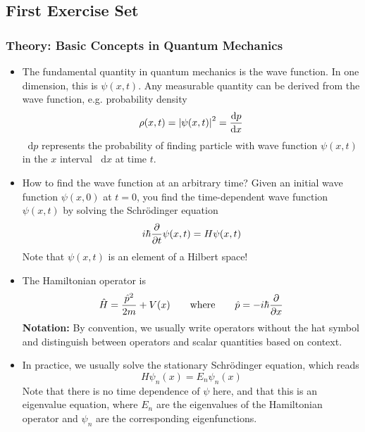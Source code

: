 \documentclass[11pt, a4paper]{article}
\newcommand{\diff}{\mathop{}\!\mathrm{d}} %
\newcommand{\eqtext}[1]{\qquad \text{#1} \qquad}
\newcommand{\schro}{Schr\"{o}dinger\xspace}
\renewcommand{\op}[1]{\hat{#1}} %
\begin{document}
\subsection{First Exercise Set}

\subsubsection{Theory: Basic Concepts in Quantum Mechanics}
\begin{itemize}
	\item The fundamental quantity in quantum mechanics is the wave function. In one dimension, this is $ \psi(x, t) $. Any measurable quantity can be derived from the wave function, e.g. probability density
	\begin{equation*}
		\rho(x, t) = \abs{\psi(x, t)}^{2} = \dv{p}{x}
	\end{equation*}
	$ \diff p $ represents the probability of finding particle with wave function $ \psi(x, t) $ in the $ x $ interval $ \diff x $ at time $ t $. 
	
	\item How to find the wave function at an arbitrary time? Given an initial wave function $ \psi(x, 0) $ at $ t = 0 $, you find the time-dependent wave function $ \psi(x, t) $ by solving the \schro equation
	\begin{equation*}
		i \hbar \pdv{}{t}\psi(x, t) = H \psi(x, t)
	\end{equation*}
	Note that $ \psi(x, t) $ is an element of a Hilbert space!
	
	\item The Hamiltonian operator is
	\begin{equation*}
		\op{H} = \frac{\op{p}^{2}}{2m} + V(x) \eqtext{where} \op{p} = - i\hbar \pdv{}{x}
	\end{equation*}
	\textbf{Notation:} By convention, we usually write operators without the hat symbol and distinguish between operators and scalar quantities based on context.
	
	\item In practice, we usually solve the stationary \schro equation, which reads
	\begin{equation*}
		H\psi_{n}(x) = E_{n}\psi_{n}(x)
	\end{equation*}
	Note that there is no time dependence of $ \psi $ here, and that this is an eigenvalue equation, where $ E_{n} $ are the eigenvalues of the Hamiltonian operator and $ \psi_{n} $ are the corresponding eigenfunctions.
	

\end{itemize}
\end{document}
